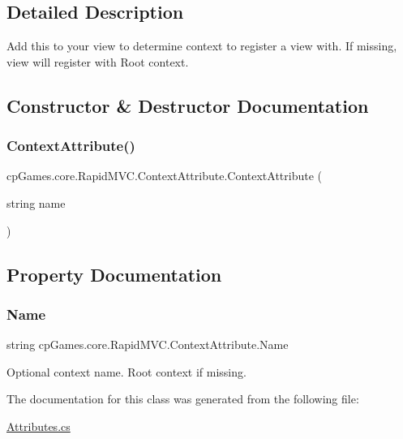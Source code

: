 \subsection{Detailed Description}
Add this to your view to determine context to register a view with. If missing, view will register with Root context. 



\subsection{Constructor \& Destructor Documentation}
\mbox{\label{classcp_games_1_1core_1_1_rapid_m_v_c_1_1_context_attribute_a2f20f2c5247220479a0844d4931b6395}} 
\subsubsection{\texorpdfstring{ContextAttribute()}{ContextAttribute()}}
{\footnotesize\ttfamily cp\+Games.\+core.\+Rapid\+M\+V\+C.\+Context\+Attribute.\+Context\+Attribute (\begin{DoxyParamCaption}\item[{string}]{name }\end{DoxyParamCaption})}



\subsection{Property Documentation}
\mbox{\label{classcp_games_1_1core_1_1_rapid_m_v_c_1_1_context_attribute_aeeb0490378fbdbaedbc5c3e0d5200c87}} 
\subsubsection{\texorpdfstring{Name}{Name}}
{\footnotesize\ttfamily string cp\+Games.\+core.\+Rapid\+M\+V\+C.\+Context\+Attribute.\+Name\hspace{0.3cm}{\ttfamily [get]}}



Optional context name. Root context if missing. 



The documentation for this class was generated from the following file\+:\begin{DoxyCompactItemize}
\item 
\mbox{\hyperlink{_attributes_8cs}{Attributes.\+cs}}\end{DoxyCompactItemize}
